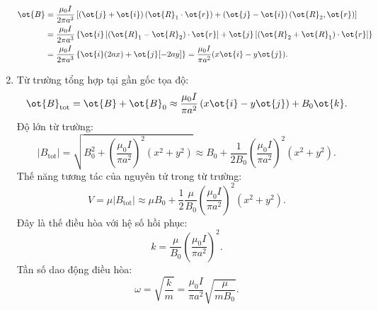 \begin{loigiai}
\begin{enumerate}[1)]
\begin{align*}
    \ot{B}&=\dfrac{\mu_{0} I}{2 \pi a^{3}}\left[(\ot{j}+\ot{i})\left(\ot{R}_{1} \cdot \ot{r}\right)+\left(\ot{j}-\ot{i}\right)\left(\ot{R}_{2}, \ot{r}\right)\right]\\&=\dfrac{\mu_{0} I}{2 \pi a^{3}}\left\{\ot{i}\left[\left(\ot{R}_{1}-\ot{R}_{2}\right) \cdot \ot{r}\right]+\ot{j}\left[\left(\ot{R}_{2}+\ot{R}_{1}\right) \cdot \ot{r}\right]\right\}\\
    &=\dfrac{\mu_{0} I}{2 \pi a^{3}}\left\{\ot{i}(2 a x)+\ot{j}[-2 a y]\right\}=\dfrac{\mu_{0} I}{\pi a^{2}}(x \ot{i}-y \ot{j}).
\end{align*}
\item  Từ trường tổng hợp tại gần gốc tọa độ:
\[
\ot{B}_{\mathrm{tot}}=\ot{B}+\ot{B}_{0} \approx \dfrac{\mu_{0} I}{\pi a^{2}}\left(x \ot{i}-y \ot{j}\right)+B_{0} \ot{k}.
\]
Độ lớn từ trường:
\[
\left|B_{\mathrm{tot}}\right|=\sqrt{B_{0}^{2}+\left(\dfrac{\mu_{0} I}{\pi a^{2}}\right)^{2}\left(x^{2}+y^{2}\right)} \approx B_{0}+\dfrac{1}{2 B_{0}}\left(\dfrac{\mu_{0} I}{\pi a^{2}}\right)^{2}\left(x^{2}+y^{2}\right).
\]
Thế năng tương tác của nguyên tử trong từ trường:
\[
V=\mu\left|B_{\mathrm{tot}}\right| \approx \mu B_{0}+\dfrac{1}{2} \dfrac{\mu}{B_{0}}\left(\dfrac{\mu_{0} I}{\pi a^{2}}\right)^{2}\left(x^{2}+y^{2}\right).
\]
Đây là thế điều hòa với hệ số hồi phục: \[k=\dfrac{\mu}{B_{0}}\left(\dfrac{\mu_{0} I}{\pi a^{2}}\right)^{2}.\]
Tần số dao động điều hòa: \[\omega=\sqrt{\dfrac{k}{m}}=\dfrac{\mu_{0} I}{\pi a^{2}} \sqrt{\dfrac{\mu}{m B_{0}}}.\]
\end{enumerate}
\end{loigiai}


